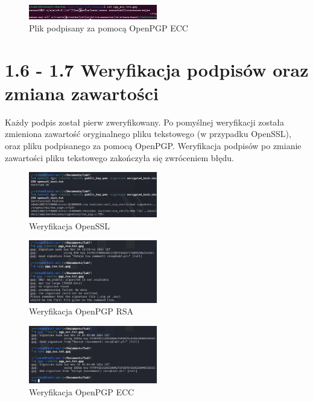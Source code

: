 \documentclass{article}
\begin{document}
\begin{figure}[H]
    \centering
    \includegraphics[width=0.5\textwidth]{signed_ecc.png}
    \caption{Plik podpisany za pomocą OpenPGP ECC}
\end{figure}


\section*{1.6 - 1.7 Weryfikacja podpisów oraz zmiana zawartości}
Każdy podpis został pierw zweryfikowany. Po pomyślnej weryfikacji została zmieniona zawartość oryginalnego pliku tekstowego (w przypadku OpenSSL), oraz pliku podpisanego za pomocą OpenPGP.
Weryfikacja podpisów po zmianie zawartości pliku tekstowego zakończyła się zwróceniem błędu.

\begin{figure}[H]
    \centering
    \includegraphics[width=0.5\textwidth]{openns_verify.png}
    \caption{Weryfikacja OpenSSL}
\end{figure}


\begin{figure}[H]
    \centering
    \includegraphics[width=0.5\textwidth]{gpg_verify_rsa.png}
    \caption{Weryfikacja OpenPGP RSA}
\end{figure}

\begin{figure}[H]
    \centering
    \includegraphics[width=0.5\textwidth]{gpg_verify_ecc.png}
    \caption{Weryfikacja OpenPGP ECC}
\end{figure}
\end{document}
